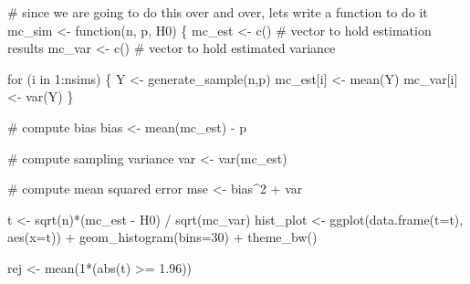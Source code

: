 \documentclass[
  letterpaper,
  DIV=11,
  numbers=noendperiod]{scrreprt}
\newenvironment{Shaded}{\begin{snugshade}}{\end{snugshade}}
\newcommand{\AttributeTok}[1]{\textcolor[rgb]{0.40,0.45,0.13}{#1}}
\newcommand{\CommentTok}[1]{\textcolor[rgb]{0.37,0.37,0.37}{#1}}
\newcommand{\ControlFlowTok}[1]{\textcolor[rgb]{0.00,0.23,0.31}{#1}}
\newcommand{\DecValTok}[1]{\textcolor[rgb]{0.68,0.00,0.00}{#1}}
\newcommand{\FloatTok}[1]{\textcolor[rgb]{0.68,0.00,0.00}{#1}}
\newcommand{\FunctionTok}[1]{\textcolor[rgb]{0.28,0.35,0.67}{#1}}
\newcommand{\NormalTok}[1]{\textcolor[rgb]{0.00,0.23,0.31}{#1}}
\newcommand{\OtherTok}[1]{\textcolor[rgb]{0.00,0.23,0.31}{#1}}
\newcommand{\SpecialCharTok}[1]{\textcolor[rgb]{0.37,0.37,0.37}{#1}}
\begin{document}
\begin{Shaded}
\begin{Highlighting}[]
\CommentTok{\# since we are going to do this over and over, let\textquotesingle{}s write a function to do it}
\NormalTok{mc\_sim }\OtherTok{\textless{}{-}} \ControlFlowTok{function}\NormalTok{(n, p, H0) \{}
\NormalTok{  mc\_est }\OtherTok{\textless{}{-}} \FunctionTok{c}\NormalTok{()  }\CommentTok{\# vector to hold estimation results}
\NormalTok{  mc\_var }\OtherTok{\textless{}{-}} \FunctionTok{c}\NormalTok{()  }\CommentTok{\# vector to hold estimated variance}

  \ControlFlowTok{for}\NormalTok{ (i }\ControlFlowTok{in} \DecValTok{1}\SpecialCharTok{:}\NormalTok{nsims) \{}
\NormalTok{    Y }\OtherTok{\textless{}{-}} \FunctionTok{generate\_sample}\NormalTok{(n,p)}
\NormalTok{    mc\_est[i] }\OtherTok{\textless{}{-}} \FunctionTok{mean}\NormalTok{(Y)}
\NormalTok{    mc\_var[i] }\OtherTok{\textless{}{-}} \FunctionTok{var}\NormalTok{(Y)}
\NormalTok{  \}}

  \CommentTok{\# compute bias}
\NormalTok{  bias }\OtherTok{\textless{}{-}} \FunctionTok{mean}\NormalTok{(mc\_est) }\SpecialCharTok{{-}}\NormalTok{ p}

  \CommentTok{\# compute sampling variance}
\NormalTok{  var }\OtherTok{\textless{}{-}} \FunctionTok{var}\NormalTok{(mc\_est)}

  \CommentTok{\# compute mean squared error}
\NormalTok{  mse }\OtherTok{\textless{}{-}}\NormalTok{ bias}\SpecialCharTok{\^{}}\DecValTok{2} \SpecialCharTok{+}\NormalTok{ var}
  
\NormalTok{  t }\OtherTok{\textless{}{-}} \FunctionTok{sqrt}\NormalTok{(n)}\SpecialCharTok{*}\NormalTok{(mc\_est }\SpecialCharTok{{-}}\NormalTok{ H0) }\SpecialCharTok{/} \FunctionTok{sqrt}\NormalTok{(mc\_var)}
\NormalTok{  hist\_plot }\OtherTok{\textless{}{-}} \FunctionTok{ggplot}\NormalTok{(}\FunctionTok{data.frame}\NormalTok{(}\AttributeTok{t=}\NormalTok{t), }\FunctionTok{aes}\NormalTok{(}\AttributeTok{x=}\NormalTok{t)) }\SpecialCharTok{+}
    \FunctionTok{geom\_histogram}\NormalTok{(}\AttributeTok{bins=}\DecValTok{30}\NormalTok{) }\SpecialCharTok{+} 
    \FunctionTok{theme\_bw}\NormalTok{()}

\NormalTok{  rej }\OtherTok{\textless{}{-}} \FunctionTok{mean}\NormalTok{(}\DecValTok{1}\SpecialCharTok{*}\NormalTok{(}\FunctionTok{abs}\NormalTok{(t) }\SpecialCharTok{\textgreater{}=} \FloatTok{1.96}\NormalTok{))}
  

\end{Highlighting}
\end{Shaded}
\end{document}
